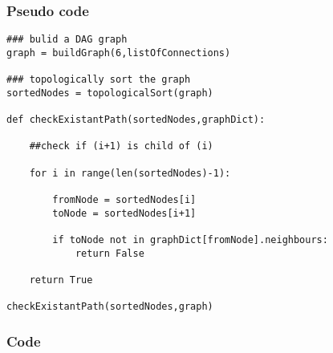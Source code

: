 \documentclass[11pt]{article}
\begin{document}
    \subsubsection{Pseudo code}\label{pseudo-code}

\begin{verbatim}
### bulid a DAG graph
graph = buildGraph(6,listOfConnections)

### topologically sort the graph
sortedNodes = topologicalSort(graph)

def checkExistantPath(sortedNodes,graphDict):
    
    ##check if (i+1) is child of (i)
    
    for i in range(len(sortedNodes)-1):
        
        fromNode = sortedNodes[i]
        toNode = sortedNodes[i+1]
        
        if toNode not in graphDict[fromNode].neighbours:
            return False
    
    return True
 
checkExistantPath(sortedNodes,graph)
\end{verbatim}

    \subsubsection{Code}\label{code}
\end{document}
